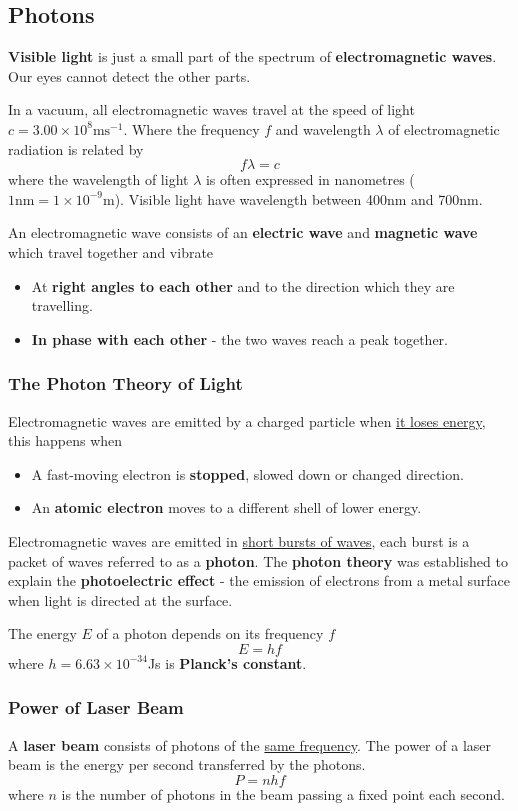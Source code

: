 \subsection{Photons}

\textbf{Visible light} is just a small part of the spectrum of \textbf{electromagnetic waves}. Our eyes cannot detect the other parts.

In a vacuum, all electromagnetic waves travel at the speed of light $c=3.00\times10^8\text{ms}^{-1}$. Where the frequency $f$ and wavelength $\lambda$ of electromagnetic radiation is related by
$$f\lambda=c$$
where the wavelength of light $\lambda$ is often expressed in nanometres ($\text{1nm}=1\times10^{-9}\text{m}$). Visible light have wavelength between 400nm and 700nm.

An electromagnetic wave consists of an \textbf{electric wave} and \textbf{magnetic wave} which travel together and vibrate
\begin{itemize}
    \item At \textbf{right angles to each other} and to the direction which they are travelling.
    \item \textbf{In phase with each other} - the two waves reach a peak together.
\end{itemize}

\subsubsection*{The Photon Theory of Light}

Electromagnetic waves are emitted by a charged particle when \underline{it loses energy}, this happens when
\begin{itemize}
    \item A fast-moving electron is \textbf{stopped}, slowed down or changed direction.
    \item An \textbf{atomic electron} moves to a different shell of lower energy.
\end{itemize}

Electromagnetic waves are emitted in \underline{short bursts of waves}, each burst is a packet of waves referred to as a \textbf{photon}. The \textbf{photon theory} was established to explain the \textbf{photoelectric effect} - the emission of electrons from a metal surface when light is directed at the surface.

The energy $E$ of a photon depends on its frequency $f$
$$E=hf$$
where $h=6.63\times10^{-34}$Js is \textbf{Planck's constant}.

\subsubsection*{Power of Laser Beam}

A \textbf{laser beam} consists of photons of the \underline{same frequency}. The power of a laser beam is the energy per second transferred by the photons.
$$P=nhf$$
where $n$ is the number of photons in the beam passing a fixed point each second.
